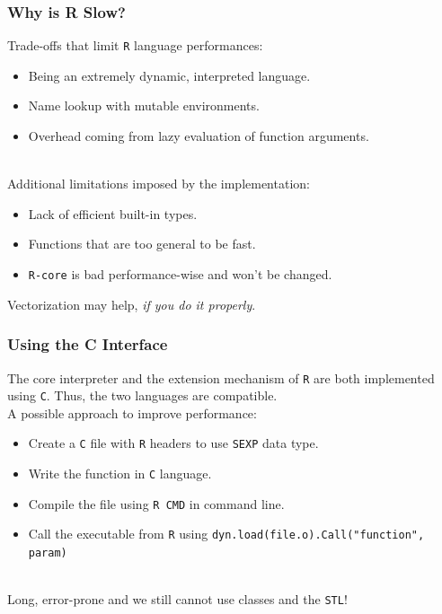 \documentclass{beamer}
\def\code#1{\texttt{#1}} %
\begin{document}

\begin{frame}
\frametitle{Why is R Slow?}
Trade-offs that limit \code{R} language performances:
\begin{itemize}
    \item Being an extremely dynamic, interpreted language. \pause
    \item Name lookup with mutable environments. \pause
    \item Overhead coming from lazy evaluation of function arguments. \pause
\end{itemize}
\\
\vspace{3mm}
Additional limitations imposed by the implementation:
\begin{itemize}
    \item Lack of efficient built-in types. \pause
    \item Functions that are too general to be fast. \pause
    \item \code{R-core} is bad performance-wise and won't be changed. \pause
\end{itemize}
\vspace{3mm}
Vectorization may help, \emph{\color{red} if you do it properly}.
\end{frame}


\begin{frame}
\frametitle{Using the C Interface}
The core interpreter and the extension mechanism of \code{R} are both implemented using \code{C}. Thus, the two languages are compatible. \pause
\\
\vspace{3mm}
A possible approach to improve performance:
\begin{itemize}
    \item Create a \code{C} file with  \code{R} headers to use \code{SEXP} data type. \pause
    \item Write the function in \code{C} language. \pause
    \item Compile the file using \code{R CMD} in command line. \pause
    \item Call the executable from \code{R} using \code{dyn.load(file.o).Call("function", param)} \pause
\end{itemize}
\\
\vspace{3mm}
Long, error-prone and we still cannot use classes and the \code{STL}!
\end{frame}
\end{document}
